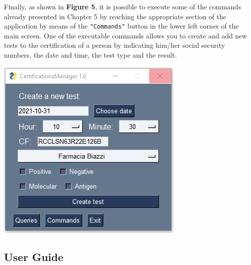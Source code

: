 \documentclass[a4paper,12pt]{article}
\begin{document}
Finally, as shown in \textbf{Figure 5}, it is possible to execute some of the commands already presented in Chapter 5 by reaching the appropriate section of the application by means of the \texttt{"Commands"} button in the lower left corner of the main screen. One of the executable commands allows you to create and add new tests to the certification of a person  by indicating him/her social security numbers, the date and time, the test type and the result.\par
\begin{center}
 		\includegraphics[width = 8 cm]{commands.png}
\end{center}
\subsection{User Guide}
\end{document}
